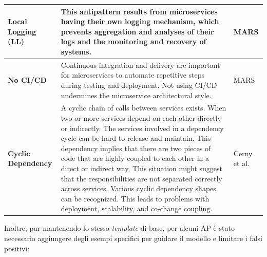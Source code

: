 \begin{table}[H]
\begin{tabular}{| p{3cm} | p{8.5cm} | p{3cm} |}
        \textbf{Local Logging \newline (LL)} & This antipattern results from microservices having their own logging mechanism, which prevents aggregation and analyses of their logs and the monitoring and recovery of systems. & MARS \cite{MARS} \\ \hline

        \textbf{No CI/CD} & Continuous integration and delivery are important for microservices to automate repetitive steps during testing and deployment. Not using CI/CD undermines the microservice architectural style. & MARS \cite{MARS} \\ \hline

        \textbf{Cyclic \newline Dependency} & A cyclic chain of calls between services exists. When
        two or more services depend on each other directly or
        indirectly. The services involved in a dependency cycle
        can be hard to release and maintain. This dependency
        implies that there are two pieces of code that are
        highly coupled to each other in a direct or indirect way.
        This situation might suggest that the responsibilities are
        not separated correctly across services. Various cyclic
        dependency shapes can be recognized. This leads to
        problems with deployment, scalability, and co-change
        coupling. & Cerny et al. \cite{CernyCatalogo} \\ \hline
        
    \end{tabular}
\end{table}
\vspace{1em}

Inoltre, pur mantenendo lo stesso \textit{template} di base, per alcuni AP è stato necessario aggiungere degli esempi specifici per guidare il modello e limitare i falsi positivi:

